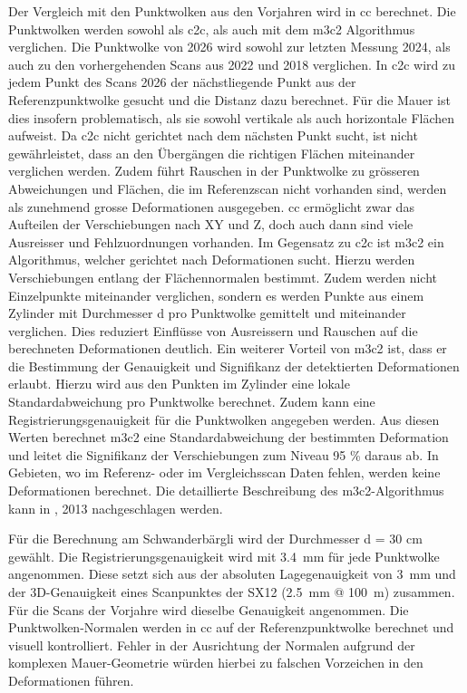 Der Vergleich mit den Punktwolken aus den Vorjahren wird in \gls{cc} \parencite{opensourceCloudCompare2024} berechnet. 
Die Punktwolken werden sowohl als \gls{c2c}, als auch mit dem \gls{m3c2} Algorithmus \parencite{lagueAccurate3DComparison2013} verglichen. 
Die Punktwolke von 2026 wird sowohl zur letzten Messung 2024, als auch zu den vorhergehenden Scans aus 2022 und 2018 verglichen. 
In \gls{c2c} wird zu jedem Punkt des Scans 2026 
der nächstliegende Punkt aus der Referenzpunktwolke gesucht und die Distanz dazu berechnet. Für die Mauer ist dies 
insofern problematisch, als sie sowohl vertikale als auch horizontale Flächen aufweist. Da \gls{c2c} nicht gerichtet 
nach dem nächsten Punkt sucht, ist nicht gewährleistet, dass an den Übergängen die richtigen Flächen miteinander verglichen werden. Zudem führt Rauschen in der Punktwolke zu grösseren Abweichungen und Flächen, die im Referenzscan nicht 
vorhanden sind, werden als zunehmend grosse Deformationen ausgegeben. \gls{cc} ermöglicht zwar das Aufteilen der Verschiebungen 
nach XY und Z, doch auch dann sind viele Ausreisser und Fehlzuordnungen vorhanden.
Im Gegensatz zu \gls{c2c} ist \gls{m3c2} ein Algorithmus, welcher gerichtet nach Deformationen sucht. Hierzu werden Verschiebungen 
entlang der Flächennormalen bestimmt. Zudem werden nicht Einzelpunkte miteinander verglichen, sondern es werden Punkte aus 
einem Zylinder mit Durchmesser d pro Punktwolke gemittelt und miteinander verglichen. Dies reduziert Einflüsse von 
Ausreissern und Rauschen auf die berechneten Deformationen deutlich. Ein weiterer Vorteil von \gls{m3c2} ist, dass 
er die Bestimmung der Genauigkeit und Signifikanz der detektierten Deformationen erlaubt. Hierzu wird aus 
den Punkten im Zylinder eine lokale Standardabweichung pro Punktwolke berechnet. Zudem kann eine Registrierungsgenauigkeit für 
die Punktwolken angegeben werden. Aus diesen Werten berechnet \gls{m3c2} eine Standardabweichung der bestimmten Deformation und 
leitet die Signifikanz der Verschiebungen zum Niveau 95 \% daraus ab. In Gebieten, wo im Referenz- oder im Vergleichsscan Daten 
fehlen, werden keine Deformationen berechnet. Die detaillierte Beschreibung des \acrshort{m3c2}-Algorithmus kann in \citeauthor{lagueAccurate3DComparison2013}, 2013 
nachgeschlagen werden.

Für die Berechnung am Schwanderbärgli wird der Durchmesser d = 30 cm gewählt. Die Registrierungsgenauigkeit wird mit 3.4~mm für 
jede Punktwolke angenommen. Diese setzt sich aus der absoluten Lagegenauigkeit von 3~mm und der 3D-Genauigkeit eines 
Scanpunktes der SX12 (2.5~mm @ 100~m) \parencite{trimble-inc.TrimbleSX12Datasheet2021} zusammen. Für die Scans der Vorjahre wird dieselbe Genauigkeit angenommen. 
Die Punktwolken-Normalen werden in \gls{cc} auf der Referenzpunktwolke berechnet und visuell kontrolliert. Fehler in der 
Ausrichtung der Normalen aufgrund der komplexen Mauer-Geometrie würden hierbei zu falschen Vorzeichen in den Deformationen führen. 

